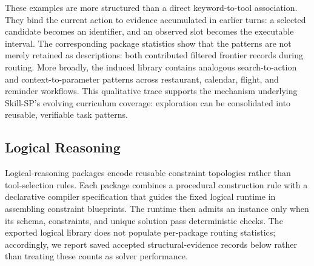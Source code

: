 These examples are more structured than a direct keyword-to-tool association. They bind the current action to evidence accumulated in earlier turns: a selected candidate becomes an identifier, and an observed slot becomes the executable interval. The corresponding package statistics show that the patterns are not merely retained as descriptions: both contributed filtered frontier records during routing. More broadly, the induced library contains analogous search-to-action and context-to-parameter patterns across restaurant, calendar, flight, and reminder workflows. This qualitative trace supports the mechanism underlying Skill-SP's evolving curriculum coverage: exploration can be consolidated into reusable, verifiable task patterns.

\subsection{Logical Reasoning}
\label{app:logical_skill_cases}

Logical-reasoning packages encode reusable constraint topologies rather than tool-selection rules. Each package combines a procedural construction rule with a declarative compiler specification that guides the fixed logical runtime in assembling constraint blueprints. The runtime then admits an instance only when its schema, constraints, and unique solution pass deterministic checks. The exported logical library does not populate per-package routing statistics; accordingly, we report saved accepted structural-evidence records below rather than treating these counts as solver performance.

